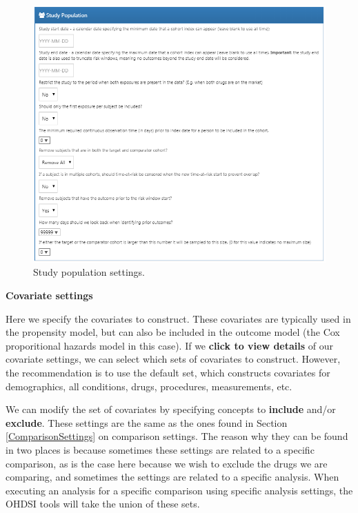 \documentclass[11pt]{book}
\theoremstyle{definition}
\theoremstyle{definition}
\theoremstyle{definition}
\theoremstyle{remark}
\begin{document}
\begin{figure}

{\centering \includegraphics[width=1\linewidth]{images/PopulationLevelEstimation/studyPopulation} 

}

\caption{Study population settings.}\label{fig:studyPopulation}
\end{figure}

\textbf{Covariate settings}

Here we specify the covariates to construct. These covariates are typically used in the propensity model, but can also be included in the outcome model (the Cox proporitional hazards model in this case). If we \textbf{click to view details} of our covariate settings, we can select which sets of covariates to construct. However, the recommendation is to use the default set, which constructs covariates for demographics, all conditions, drugs, procedures, measurements, etc.

We can modify the set of covariates by specifying concepts to \textbf{include} and/or \textbf{exclude}. These settings are the same as the ones found in Section \ref{ComparisonSettings} on comparison settings. The reason why they can be found in two places is because sometimes these settings are related to a specific comparison, as is the case here because we wish to exclude the drugs we are comparing, and sometimes the settings are related to a specific analysis. When executing an analysis for a specific comparison using specific analysis settings, the OHDSI tools will take the union of these sets.
\end{document}
